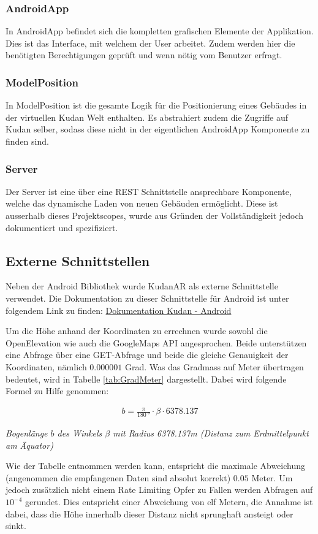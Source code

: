 \documentclass[a4paper]{scrreprt}
\newcommand{\myequations}[1]{
	\addcontentsline{equ}{myequations}{\protect\numberline{\theequation}#1}
}
\newcommand{\indexequation}[3]{
	\begin{align} \label{#3} \ensuremath{\boxed{#1}} \end{align}
	\myequations{#3} \centering \small \textit{#2} \normalsize \justify }
\begin{document}
\subsubsection{AndroidApp}
In AndroidApp befindet sich die kompletten grafischen Elemente der Applikation. Dies ist das Interface, mit welchem der User arbeitet. Zudem werden hier die benötigten Berechtigungen geprüft und wenn nötig vom Benutzer erfragt.

\subsubsection{ModelPosition}
In ModelPosition ist die gesamte Logik für die Positionierung eines Gebäudes in der virtuellen Kudan Welt enthalten. Es abstrahiert zudem die Zugriffe auf Kudan selber, sodass diese nicht in der eigentlichen AndroidApp Komponente zu finden sind.

\subsubsection{Server}
Der Server ist eine über eine REST Schnittstelle ansprechbare Komponente, welche das dynamische Laden von neuen Gebäuden ermöglicht. Diese ist ausserhalb dieses Projektscopes, wurde aus Gründen der Vollständigkeit jedoch dokumentiert und spezifiziert.

\subsection{Externe Schnittstellen}
Neben der Android Bibliothek wurde KudanAR als externe Schnittstelle verwendet. Die Dokumentation zu dieser Schnittstelle für Android ist unter folgendem Link zu finden:
\href{https://www.kudan.eu/docs-reference/AndroidDocs/annotated.html}{Dokumentation Kudan - Android}

Um die Höhe anhand der Koordinaten zu errechnen wurde sowohl die OpenElevation wie auch die GoogleMaps API angesprochen. Beide unterstützen eine Abfrage über eine GET-Abfrage und beide die gleiche Genauigkeit der Koordinaten, nämlich $0.000 001$ Grad. Was das Gradmass auf Meter übertragen bedeutet, wird in Tabelle \ref{tab:GradMeter} dargestellt. Dabei wird folgende Formel zu Hilfe genommen:

\indexequation{b = \frac{\pi}{\SI{180}{\degree}}\cdot\beta\cdot 6378.137}{Bogenlänge $b$ des Winkels $\beta$ mit Radius 6378.137m (Distanz zum Erdmittelpunkt am Äquator)}{Bogenlaenge}

Wie der Tabelle entnommen werden kann, entspricht die maximale Abweichung (angenommen die empfangenen Daten sind absolut korrekt) $0.05$ Meter. Um jedoch zusätzlich nicht einem Rate Limiting Opfer zu Fallen werden Abfragen auf $10^{-4}$ gerundet. Dies entspricht einer Abweichung von elf Metern, die Annahme ist dabei, dass die Höhe innerhalb dieser Distanz nicht sprunghaft ansteigt oder sinkt.
\end{document}
